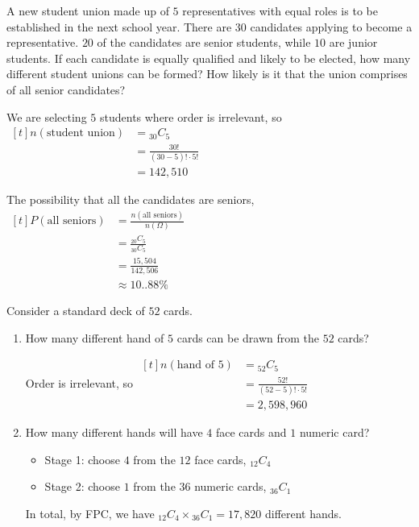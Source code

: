 \begin{example}
    A new student union made up of $5$ representatives with equal roles is to be established in the next school year. There are $30$ candidates applying to become a representative. $20$ of the candidates are senior students, while $10$ are junior students. If each candidate is equally qualified and likely to be elected, how many different student unions can be formed? How likely is it that the union comprises of all senior candidates?

    We are selecting $5$ students where order is irrelevant, so $\begin{aligned}[t]
        n(\text{student union}) & = {}_{30}C_5                     \\
                                & = \frac{30!}{(30 - 5)! \cdot 5!} \\
                                & = 142,510
    \end{aligned}$

    The possibility that all the candidates are seniors, $\begin{aligned}[t]
        P(\text{all seniors}) & = \frac{n(\text{all seniors})}{n(\Omega)} \\
                              & = \frac{{}_{20}C_5}{{}_{30}C_5}           \\
                              & = \frac{15,504}{142,506}                  \\
                              & \approx 10..88 \%
    \end{aligned}$
\end{example}

\begin{example}
    Consider a standard deck of $52$ cards. 

    \begin{enumerate}[label=\alph*)]
        \item How many different hand of $5$ cards can be drawn from the $52$ cards? 
        
    Order is irrelevant, so $\begin{aligned}[t]
        n(\text{hand of } 5) & = {}_{52}C_5                     \\
                             & = \frac{52!}{(52 - 5)! \cdot 5!} \\
                             & = 2,598,960
    \end{aligned}$

    \item How many different hands will have $4$ face cards and $1$ numeric card?
    
    \begin{itemize}
        \item Stage 1: choose $4$ from the $12$ face cards, ${}_{12}C_4$
        \item Stage 2: choose $1$ from the $36$ numeric cards, ${}_{36}C_1$
    \end{itemize}

    In total, by FPC, we have ${}_{12}C_4 \times {}_{36}C_1 = 17,820$ different hands. 
    \end{enumerate}
\end{example}

